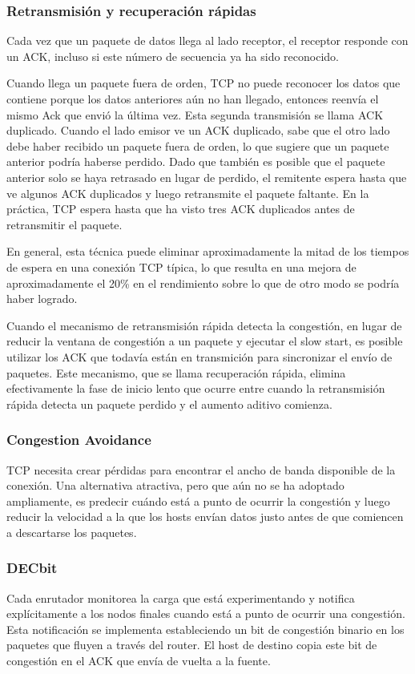 \subsubsection*{Retransmisión y recuperación rápidas}
Cada vez que un paquete de datos llega al lado receptor, el receptor responde con un ACK, incluso si este número de secuencia ya ha sido reconocido. 

Cuando llega un paquete fuera de orden, TCP no puede reconocer los datos que contiene porque los datos anteriores aún no han llegado, entonces reenvía el mismo Ack que envió la última vez. Esta segunda transmisión se llama ACK duplicado. Cuando el lado emisor ve un ACK duplicado, sabe que el otro lado debe haber recibido un paquete fuera de orden, lo que sugiere que un paquete anterior podría haberse perdido. Dado que también es posible que el paquete anterior solo se haya retrasado en lugar de perdido, el remitente espera hasta que ve algunos ACK duplicados y luego retransmite el paquete faltante. En la práctica, TCP espera hasta que ha visto tres ACK duplicados antes de retransmitir el paquete.

En general, esta técnica puede eliminar aproximadamente la mitad de los tiempos de espera en una conexión TCP típica, lo que resulta en una mejora de aproximadamente el 20\% en el rendimiento sobre lo que de otro modo se podría haber logrado. 

Cuando el mecanismo de retransmisión rápida detecta la congestión, en lugar de reducir la ventana de congestión a un paquete y ejecutar el slow start, es posible utilizar los ACK que todavía están en transmición para sincronizar el envío de paquetes. Este mecanismo, que se llama recuperación rápida, elimina efectivamente la fase de inicio lento que ocurre entre cuando la retransmisión rápida detecta un paquete perdido y el aumento aditivo comienza.

\subsubsection{Congestion Avoidance}
TCP necesita crear pérdidas para encontrar el ancho de banda disponible de la conexión. Una alternativa atractiva, pero que aún no se ha adoptado ampliamente, es predecir cuándo está a punto de ocurrir la congestión y luego reducir la velocidad a la que los hosts envían datos justo antes de que comiencen a descartarse los paquetes.

\subsubsection*{DECbit}
Cada enrutador monitorea la carga que está experimentando y notifica explícitamente a los nodos finales cuando está a punto de ocurrir una congestión. Esta notificación se implementa estableciendo un bit de congestión binario en los paquetes que fluyen a través del router. El host de destino copia este bit de congestión en el ACK que envía de vuelta a la fuente.

